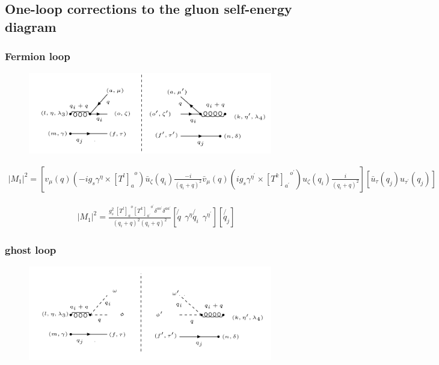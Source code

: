 \pagebreak
\subsection{One-loop corrections to the gluon self-energy diagram}
\subsubsection{Fermion loop}
\begin{figure}[h!]
\centering
\includegraphics[width=0.95\textwidth]{images/self-Energy.png}
\end{figure}
\begin{equation}
\begin{split}
|M_1|^2=[ {v}_{\mu}(q)(-ig_s {\gamma}^{\eta}\times {[{T^l}]_a}^o) {\bar{u}}_{\zeta}(q_i) \frac{-i}{(q_i +q)^2} {\bar{v}}_{\mu}(q)(ig_s \gamma^{{\eta}^{\prime}}\times {[T^k]_{a^{\prime}}}^{o^{\prime}}) {{u}}_{\zeta}(q_i) \frac{i}{(q_i +q)^2}][\bar{u}_{\tau}(q_j){u}_{{\tau}^{\prime}}(q_j)]
\end{split}
\end{equation}

\begin{equation}
\begin{split}
|M_1|^2=\frac{g_s^2\: {[{T^l}]_a}^o {[T^k]_{a^{\prime}}}^{o^{\prime}} \delta^{{o}{o}^{\prime}} \delta^{{a}{a}^{\prime}}}{(q_i +q)^2 (q_i +q)^2}[\not{q}\:\:{\gamma}^{\eta} \not{q_i}\:\: \gamma^{{\eta}^{\prime}}][\not{q_j}]
\end{split}
\end{equation}

\pagebreak
\subsubsection{ghost loop}
\begin{figure}[h!]
\centering
\includegraphics[width=0.95\textwidth]{images/ghostM1squer.png}
\end{figure}

